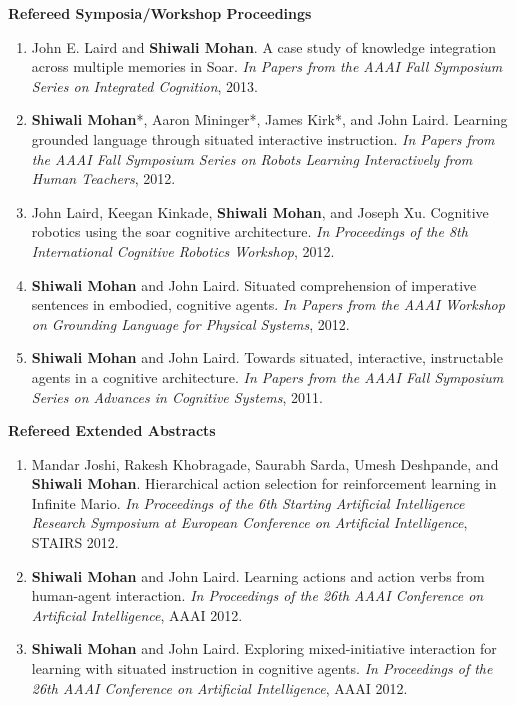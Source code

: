 \documentclass[margin,line,11pt]{res}
\begin{document}
\begin{resume}
\textbf{Refereed Symposia/Workshop Proceedings}
\begin{enumerate}[label=\lbrack W\arabic*\rbrack:,leftmargin=*]
\item John E. Laird and \textbf{Shiwali Mohan}. A case study of knowledge integration across multiple memories in
Soar. \emph{In Papers from the AAAI Fall Symposium Series on Integrated Cognition}, 2013.
\item \textbf{Shiwali Mohan}*, Aaron Mininger*, James Kirk*, and John Laird. Learning grounded language through
situated interactive instruction. \emph{In Papers from the AAAI Fall Symposium Series on Robots Learning Interactively from Human Teachers}, 2012.
\item John Laird, Keegan Kinkade, \textbf{Shiwali Mohan}, and Joseph Xu. Cognitive robotics using the soar cognitive
architecture. \emph{In Proceedings of the 8th International Cognitive Robotics Workshop}, 2012.
\item \textbf{Shiwali Mohan} and John Laird. Situated comprehension of imperative sentences in embodied, cognitive
agents. \emph{In Papers from the AAAI Workshop on Grounding Language for Physical Systems}, 2012.
\item \textbf{Shiwali Mohan} and John Laird. Towards situated, interactive, instructable agents in a cognitive architecture. \emph{In Papers from the AAAI Fall Symposium Series on Advances in Cognitive Systems}, 2011.
\end{enumerate}


\textbf{Refereed Extended Abstracts}
\begin{enumerate}[label=\lbrack A\arabic*\rbrack,leftmargin=*]
\item Mandar Joshi, Rakesh Khobragade, Saurabh Sarda, Umesh Deshpande, and \textbf{Shiwali Mohan}. Hierarchical
action selection for reinforcement learning in Infinite Mario. \emph{In Proceedings of the 6th Starting Artificial
Intelligence Research Symposium at European Conference on Artificial Intelligence}, STAIRS 2012.

\item \textbf{Shiwali Mohan} and John Laird. Learning actions and action verbs from human-agent interaction. \emph{In
Proceedings of the 26th AAAI Conference on Artificial Intelligence}, AAAI 2012.

\item \textbf{Shiwali Mohan} and John Laird. Exploring mixed-initiative interaction for learning with situated instruction in cognitive agents. \emph{In Proceedings of the 26th AAAI Conference on Artificial Intelligence}, AAAI 2012.


\end{enumerate}
\end{resume}
\end{document}
